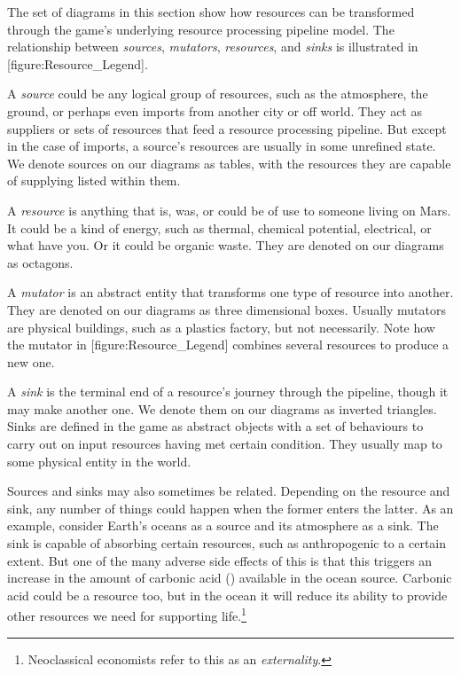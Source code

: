 
The set of diagrams in this section show how resources can be transformed through the game's underlying resource processing pipeline model. The relationship between {\it sources}, {\it mutators}, {\it resources}, and {\it sinks} is illustrated in [figure:Resource_Legend].

    {}
    
A {\it source} could be any logical group of resources, such as the atmosphere, the ground, or perhaps even imports from another city or off world.  They act as suppliers or sets of resources that feed a resource processing pipeline. But except in the case of imports, a source's resources are usually in some unrefined state. We denote sources on our diagrams as tables, with the resources they are capable of supplying listed within them.

A {\it resource} is anything that is, was, or could be of use to someone living on Mars. It could be a kind of energy, such as thermal, chemical potential, electrical, or what have you. Or it could be organic waste. They are denoted on our diagrams as octagons.

A {\it mutator} is an abstract entity that transforms one type of resource into another. They are denoted on our diagrams as three dimensional boxes. Usually mutators are physical buildings, such as a plastics factory, but not necessarily. Note how the mutator in [figure:Resource_Legend] combines several resources to produce a new one.

A {\it sink} is the terminal end of a resource's journey through the pipeline, though it may make another one. We denote them on our diagrams as inverted triangles. Sinks are defined in the game as abstract objects with a set of behaviours to carry out on input resources having met certain condition. They usually map to some physical entity in the world. 

Sources and sinks may also sometimes be related. Depending on the resource and sink, any number of things could happen when the former enters the latter. As an example, consider Earth's oceans as a source and its atmosphere as a sink. The sink is capable of absorbing certain resources, such as anthropogenic  to a certain extent. But one of the many adverse side effects of this is that this triggers an increase in the amount of carbonic acid () available in the ocean source. Carbonic acid could be a resource too, but in the ocean it will reduce its ability to provide other resources we need for supporting life.\footnote{Neoclassical economists refer to this as an {\it externality}.} 


